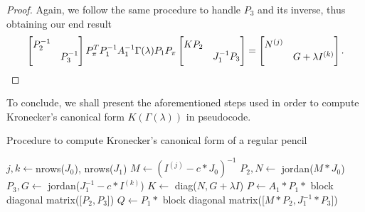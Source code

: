 \begin{proof}
    Again, we follow the same procedure to handle \(P_{3}\) and its inverse, thus obtaining our end result
    \begin{gather}
        \scalemath{0.975}{
            \begin{bmatrix}
                P_{2}^{-1} & \\
                & P_{3}^{-1}
            \end{bmatrix}
            P_{\pi}^T P_{1}^{-1} A_{1}^{-1} \Gamma(\lambda) P_{1} P_{\pi}
            \begin{bmatrix}
                KP_{2} & \\
                & J_{1}^{-1}P_{3}
            \end{bmatrix} =
            \begin{bmatrix}
                N^{(j)} & \\
                & G + \lambda I^{(k)}
            \end{bmatrix}. \label{gamma-reg}
        }
    \end{gather}
\end{proof}


To conclude, we shall present the aforementioned steps used in order to compute Kronecker's canonical form
\(K(\Gamma(\lambda))\) in pseudocode.
\pagebreak
\begin{algorithm}[!h]\label{alg:kcf-regular}
    \caption{Procedure to compute Kronecker's canonical form of a regular pencil}
    $j, k \gets $nrows($J_0$), nrows($J_1$)\;
    $M \gets (I^{(j)} - c*J_{0})^{-1}$\;
    $P_2, N \gets $ jordan($M * J_0$)\;
    $P_3, G \gets $ jordan($J_{1}^{-1} - c*I^{(k)}$)\;
    $K \gets $ diag($N, G +\lambda I$)\;
    $P \gets A_1 * P_1 * $ block diagonal matrix([$P_2, P_3$])\;
    $Q \gets P_1 * $ block diagonal matrix([$M * P_2, J_1^{-1} * P_3$])\;
    \;
\end{algorithm}
\pagebreak
